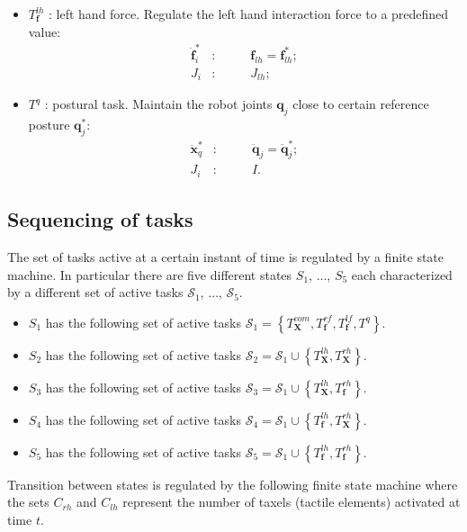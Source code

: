 \documentclass[12pt,a4paper,twoside]{article}
\begin{document}
\begin{itemize}
\item $T^{lh}_{\bm f}$ : left hand force. Regulate the left hand interaction force to a predefined value: 
\begin{eqnarray*}
\ddot {\bm f}^*_{i} &:& \qquad {\bm f}_{lh} = {\bm f}^*_{lh} ;\\
J_i &:& \qquad J_{lh};
\end{eqnarray*}

\item $T^q$ : postural task. Maintain the robot joints $\bm q_j$ close to certain reference posture $\bm q^*_j$:
\begin{eqnarray*} 
\ddot {\bm x}^*_{q} &:& \qquad \ddot {\bm q}_j = \ddot {\bm q}_j^*;\\
J_i &:& \qquad I.
\end{eqnarray*}

\end{itemize}


\subsection{Sequencing of tasks} \label{sec:taskSequencing}

The set of tasks active at a certain instant of time is regulated by a finite state machine. In particular there are five different states $S_1$, $\dots$, $S_5$ each characterized by a different set of active tasks $\mathcal S_1$, $\dots$, $\mathcal S_5$.

\begin{itemize}
\item $S_1$ has the following set of active tasks $\mathcal S_1 = \left\{ T^{com}_{\bm X}, T^{rf}_{\bm f}, T^{lf}_{\bm f}, T^q\right\}$.
\item $S_2$ has the following set of active tasks $\mathcal S_2 = \mathcal S_1 \cup \left\{  T^{lh}_{\bm X}, T^{rh}_{\bm X} \right\}$.
\item $S_3$ has the following set of active tasks $\mathcal S_3 = \mathcal S_1 \cup \left\{  T^{lh}_{\bm X}, T^{rh}_{\bm f} \right\}$.
\item $S_4$ has the following set of active tasks $\mathcal S_4 = \mathcal S_1 \cup \left\{  T^{lh}_{\bm f}, T^{rh}_{\bm X} \right\}$.
\item $S_5$ has the following set of active tasks $\mathcal S_5 = \mathcal S_1 \cup \left\{  T^{lh}_{\bm f}, T^{rh}_{\bm f} \right\}$.
\end{itemize}

Transition between states is regulated by the following finite state machine where the sets $C_{rh}$ and $C_{lh}$ represent the number of taxels (tactile elements) activated at time $t$. 
\end{document}
